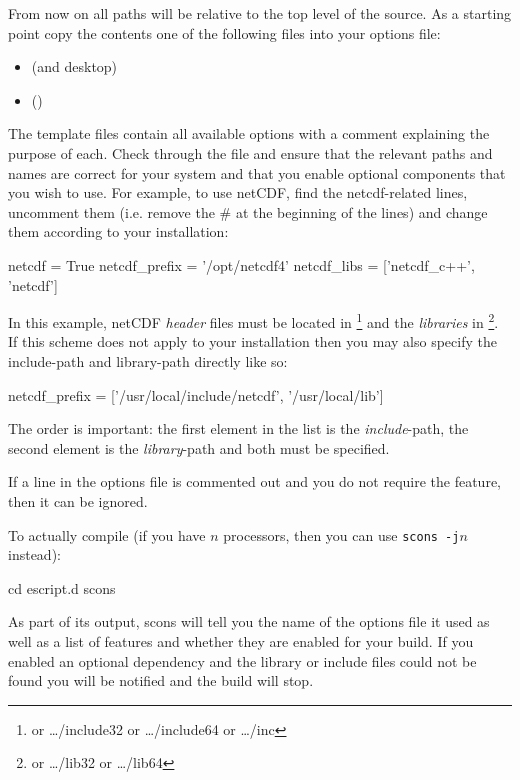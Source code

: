 From now on all paths will be relative to the top level of the source.
As a starting point copy the contents one of the following files into your options file:
\begin{itemize}
\item {} (\linux and \macosx desktop)
\item {} (\winxp)
\end{itemize}

The template files contain all available options with a comment explaining the
purpose of each.
Check through the file and ensure that the relevant paths and names are correct
for your system and that you enable optional components that you wish to use.
For example, to use netCDF, find the netcdf-related lines, uncomment them
(i.e. remove the \# at the beginning of the lines) and change them according
to your installation:
\begin{shellCode}
netcdf = True
netcdf_prefix = '/opt/netcdf4'
netcdf_libs = ['netcdf_c++', 'netcdf']
\end{shellCode}

In this example, netCDF \emph{header} files must be located in
\footnote{or \ldots/include32 or \ldots/include64 or \ldots/inc}
and the \emph{libraries} in \footnote{or \ldots/lib32 or \ldots/lib64}.
If this scheme does not apply to your installation then you may also specify
the include-path and library-path directly like so:
\begin{shellCode}
netcdf_prefix = ['/usr/local/include/netcdf', '/usr/local/lib']
\end{shellCode}
The order is important: the first element in the list is the
\emph{include}-path, the second element is the \emph{library}-path and both
must be specified.

If a line in the options file is commented out and you do not require the
feature, then it can be ignored.
 
To actually compile (if you have $n$ processors, then you can use \texttt{scons -j$n$} instead):

\begin{shellCode}
cd escript.d
scons
\end{shellCode}

As part of its output, scons will tell you the name of the options file it used
as well as a list of features and whether they are enabled for your build.
If you enabled an optional dependency and the library or include files could
not be found you will be notified and the build will stop.

